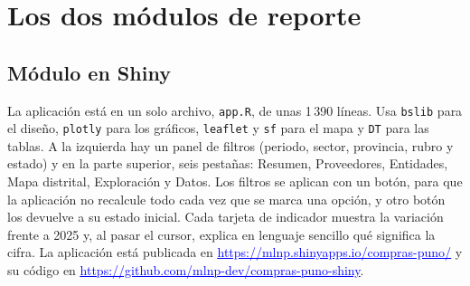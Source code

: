 \documentclass[12pt,a4paper]{article}
\newcommand{\enlace}[2]{\href{#1}{\textcolor{blue}{#2}}}
\begin{document}
\section{Los dos módulos de reporte}
\subsection{Módulo en Shiny}
La aplicación está en un solo archivo, \texttt{app.R}, de unas 1\,390 líneas. Usa \texttt{bslib} para el
diseño, \texttt{plotly} para los gráficos, \texttt{leaflet} y \texttt{sf} para el mapa
\citep{pebesma2018} y \texttt{DT} para las tablas. A la izquierda hay un panel de filtros (periodo,
sector, provincia, rubro y estado) y en la parte superior, seis pestañas: Resumen, Proveedores, Entidades, Mapa
distrital, Exploración y Datos. Los filtros se aplican con un botón, para que la aplicación no recalcule
todo cada vez que se marca una opción, y otro botón los devuelve a su estado inicial. Cada tarjeta de
indicador muestra la variación frente a 2025 y, al pasar el cursor, explica en lenguaje sencillo qué
significa la cifra. La aplicación está publicada en \enlace{https://mlnp.shinyapps.io/compras-puno/}{\uline{https:/}\allowbreak \uline{/}\allowbreak \uline{mlnp.}\allowbreak \uline{shinyapps.}\allowbreak \uline{io/}\allowbreak \uline{compras-}\allowbreak \uline{puno/}} y su
código en \enlace{https://github.com/mlnp-dev/compras-puno-shiny}{\uline{https:/}\allowbreak \uline{/}\allowbreak \uline{github.}\allowbreak \uline{com/}\allowbreak \uline{mlnp-}\allowbreak \uline{dev/}\allowbreak \uline{compras-}\allowbreak \uline{puno-}\allowbreak \uline{shiny}}.
\end{document}
